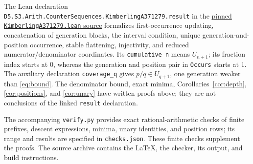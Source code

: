 \documentclass[11pt]{article}
\begin{document}
The Lean declaration
\texttt{D5.S3.Arith.CounterSequences.}\allowbreak\texttt{KimberlingA371279.result}
in the \href{https://github.com/the-omega-institute/trureturing/blob/f3466406d8191001830cf15e84db4578d4891435/D5/S3/Arith/CounterSequences/KimberlingA371279.lean}{pinned \texttt{KimberlingA371279.lean} source}
formalizes first-occurrence updating, concatenation of generation blocks,
the interval condition, unique generation-and-position occurrence, stable
flattening, injectivity, and reduced numerator/denominator coordinates.
Its \texttt{cumulative n} means $U_{n+1}$; its fraction index starts at $0$,
whereas the generation and position pair in \texttt{Occurs} starts at $1$.
The auxiliary declaration \texttt{coverage\_q} gives
$p/q\in U_{q+1}$, one generation weaker than \eqref{eq:bound}.
The denominator bound, exact minima, Corollaries~\ref{cor:depth},
\ref{cor:positions}, and \ref{cor:unary} have written proofs above;
they are not conclusions of the linked \texttt{result} declaration.

The accompanying \texttt{verify.py} provides exact rational-arithmetic
checks of finite prefixes, descent expressions, minima, unary identities,
and position rows; its
range and results are specified in \texttt{checks.json}. These finite
checks supplement the proofs. The source archive contains the LaTeX,
the checker, its output, and build instructions.
\end{document}
